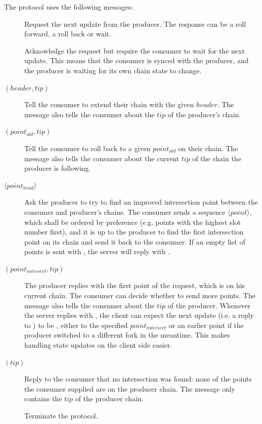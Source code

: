 The protocol uses the following messages:
\begin{description}
\item [\MsgRequestNext]
      Request the next update from the producer.  The response can be a roll
      forward, a roll back or wait.
\item [\MsgAwaitReply]
      Acknowledge the request but require the consumer to wait for the next update.
      This means that the consumer is synced with the producer, and
      the producer is waiting for its own chain state to change.
\item [\MsgRollForward{} {\boldmath $(header, tip)$}]
      Tell the consumer to extend their chain with the given $header$.
      The message also tells the consumer about the $tip$ of the producer's chain.
\item [\MsgRollBackward{} {\boldmath $(point_{old}, tip)$}]
      Tell the consumer to roll back to a given $point_{old}$ on their chain.
      The message also tells the consumer about the current  $tip$ of the chain the producer is following.
\item [\MsgFindIntersect{} {\boldmath $\langle point_{head} \rangle $}]
      Ask the producer to try to find an improved intersection point between
      the consumer and producer's chains.
      The consumer sends a sequence {\boldmath $\langle point \rangle $}, which
      shall be ordered by preference (e.g. points with the highest slot number
      first), and it is up to the producer to find the first intersection point
      on its chain and send it back to the consumer.  If an empty list of
      points is sent with \MsgFindIntersect{}, the server will reply with
      \MsgIntersectNotFound{}.
\item [\MsgIntersectFound{} {\boldmath $(point_{intersect} ,tip)$}]
      The producer replies with the first point of the request, which is on his current chain.
      The consumer can decide whether to send more points.
      The message also tells the consumer about the $tip$ of the producer.
      Whenever the server replies with \MsgIntersectFound{}, the client can
      expect the next update (i.e. a reply to \MsgRequestNext{}) to be
      \MsgRollBackward{}, either to the specified $point_{intersect}$ or an earlier
      point if the producer switched to a different fork in the meantime.
      This makes handling state updates on the client side easier.
\item [\MsgIntersectNotFound{} {\boldmath $(tip)$}]
      Reply to the consumer that no intersection was found: none of the
      points the consumer supplied are on the producer chain.
      The message only contains the $tip$ of the producer chain.
\item [\MsgDone]
      Terminate the protocol.
\end{description}

